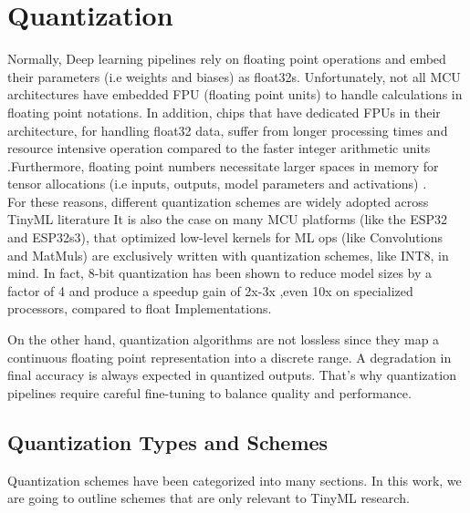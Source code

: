 \documentclass[12pt,DIV16,BCOR12mm,a4paper,footinclude=false,headinclude,parskip=half-,twoside,openright,cleardoublepage=empty,toc=index,bibliography=totoc,listof=totoc]{scrreprt}
\numberwithin{equation}{chapter}
\begin{document}
    \section{Quantization}
    Normally, Deep learning pipelines rely on floating point operations and embed their parameters (i.e weights and biases)
    as float32s. Unfortunately, not all MCU architectures have embedded FPU (floating point units) to handle calculations
    in floating point notations. In addition, chips that have dedicated FPUs in their architecture, for handling float32
    data, suffer from longer processing times and resource intensive operation compared to the faster integer arithmetic
    units \cite{krishnamoorthiQuantizingDeepConvolutional2018,jacobQuantizationTrainingNeural2017,nagelWhitePaperNeural2021}.Furthermore, floating point numbers necessitate
    larger spaces in memory for tensor allocations (i.e inputs, outputs, model parameters and activations)
    \cite{krishnamoorthiQuantizingDeepConvolutional2018}.
    \\
    For these reasons, different quantization schemes are widely adopted across TinyML literature It is also the case on many MCU platforms (like the ESP32 and ESP32s3),
    that optimized low-level kernels for ML ops (like Convolutions and MatMuls) are exclusively written with quantization schemes, like INT8, in mind.
    In fact, 8-bit quantization has been shown to reduce model sizes by a factor of 4 and produce a speedup gain of 2x-3x ,even 
    10x on specialized processors, compared to float Implementations\cite{krishnamoorthiQuantizingDeepConvolutional2018}.

    On the other hand, quantization algorithms are not lossless since they map a continuous floating point representation into a discrete
    range. A degradation in final accuracy is always expected in quantized outputs. That's why quantization pipelines require careful fine-tuning to balance
    quality and performance.  
    \subsection{Quantization Types and Schemes}
    Quantization schemes have been categorized into many sections. In this work, we are going to outline schemes that are only relevant to TinyML research.
    
\end{document}
